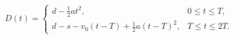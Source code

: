 \documentclass[border=2.5pt]{standalone}
\begin{document}
$\displaystyle D(t)=\begin{cases}d-\frac12at^2,&0\le t\le T,\\d-s-v_0(t-T)+\frac12a(t-T)^2,&T\le t\le2T.\end{cases}$
\end{document}
